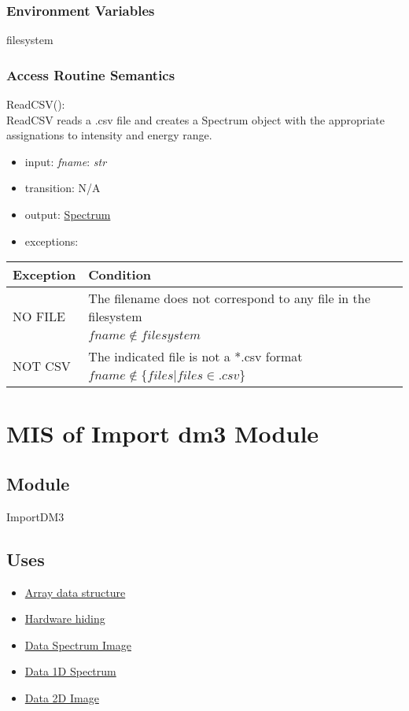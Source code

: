 \documentclass[12pt, titlepage]{article}
\begin{document}
\subsubsection{Environment Variables}
filesystem

\subsubsection{Access Routine Semantics}

\noindent ReadCSV():\\
ReadCSV reads a .csv file and creates a Spectrum object with the appropriate
assignations to intensity and energy range.
\begin{itemize}
    \item input: \textit{fname}: \textit{str}
    \item transition: N/A 
    \item output: \hyperref[Mod:Spectrum]{Spectrum}
    \item exceptions:
\end{itemize}
\begin{center}
    \begin{tabular}{p{3cm} p{12cm}}
        \toprule[0.15em]
        \textbf{Exception} & \textbf{Condition}\\
        \midrule[0.1em]
        \multirow{2}{0.25\textwidth}{NO FILE} & The filename does not correspond to
        any file in the filesystem\\ 
        & $fname \notin filesystem$\\ 
        \midrule[0.05em]
        \multirow{2}{0.25\textwidth}{NOT CSV} & The indicated file is not a *.csv
        format\\
        & $fname \notin \{files|files \in .csv\}$\\ 
        \bottomrule[0.15em]
    \end{tabular}
\end{center}


\section{MIS of Import dm3 Module} \label{Mod:ImportDM3}

\subsection{Module}

ImportDM3

\subsection{Uses}
\begin{itemize}
    \item \hyperref[Mod:Array]{Array data structure}
    \item \hyperref[Mod:HH]{Hardware hiding}
    \item \hyperref[Mod:SI]{Data Spectrum Image}
    \item \hyperref[Mod:Spectrum]{Data 1D Spectrum}
    \item \hyperref[Mod:Image]{Data 2D Image}
\end{itemize}
\end{document}
